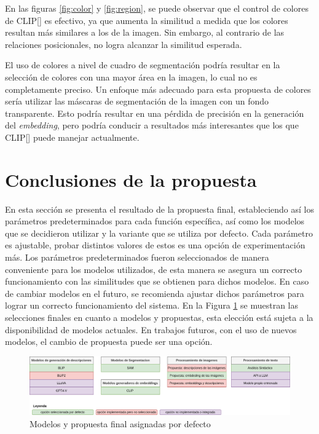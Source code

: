En las figuras \ref{fig:color} y \ref{fig:region}, se puede observar que el control de colores de CLIP[\cite{clip}] es efectivo, ya que aumenta la similitud a medida que los colores resultan más similares a los de la imagen. Sin embargo, al contrario de las relaciones posicionales, no logra alcanzar la similitud esperada.

El uso de colores a nivel de cuadro de segmentación podría resultar en la selección de colores con una mayor área en la imagen, lo cual no es completamente preciso. Un enfoque más adecuado para esta propuesta de colores sería utilizar las máscaras de segmentación de la imagen con un fondo transparente. Esto podría resultar en una pérdida de precisión en la generación del \textit{embedding}, pero podría conducir a resultados más interesantes que los que CLIP[\cite{clip}] puede manejar actualmente.


\section{Conclusiones de la propuesta}
En esta sección se presenta el resultado de la propuesta final, estableciendo así los parámetros predeterminados para cada función específica, así como los modelos que se decidieron utilizar y la variante que se utiliza por defecto. Cada parámetro es ajustable, probar distintos valores de estos es una opción de experimentación más. Los parámetros predeterminados fueron seleccionados de manera conveniente para los modelos utilizados, de esta manera se asegura un correcto funcionamiento con las similitudes que se obtienen para dichos modelos. En caso de cambiar modelos en el futuro, se recomienda ajustar dichos parámetros para lograr un correcto funcionamiento del sistema. En la Figura \ref{fig:propuestafinal} se muestran las selecciones finales en cuanto a modelos y propuestas, esta elección está sujeta a la disponibilidad de modelos actuales. En trabajos futuros, con el uso de nuevos modelos, el cambio de propuesta puede ser una opción.

\begin{figure}[H]
    \centering
     \includegraphics[width=\textwidth]{Graphics/PropuestaFinal.drawio.png}
     \caption{Modelos y propuesta final asignadas por defecto }
\label{fig:propuestafinal}
\end{figure}

